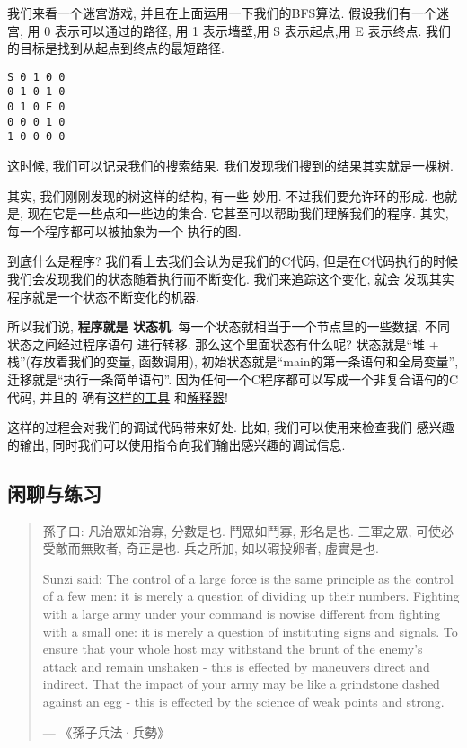 我们来看一个迷宫游戏, 并且在上面运用一下我们的BFS算法. 假设我们有一个迷宫,
用 0 表示可以通过的路径,
用 1 表示墙壁,用 S 表示起点,用 E 表示终点. 我们的目标是找到从起点到终点的最短路径. 

\begin{lstlisting}
S 0 1 0 0
0 1 0 1 0
0 1 0 E 0
0 0 0 1 0
1 0 0 0 0    
\end{lstlisting}



这时候, 我们可以记录我们的搜索结果. 我们发现我们搜到的结果其实就是一棵树. 

 其实, 我们刚刚发现的树这样的结构, 有一些
妙用. 不过我们要允许环的形成. 也就是, 现在它是一些点和一些边的集合.
它甚至可以帮助我们理解我们的程序. 其实, 每一个程序都可以被抽象为一个
执行的图. 

到底什么是程序? 我们看上去我们会认为是我们的C代码, 但是在C代码执行的时候
我们会发现我们的状态随着执行而不断变化. 我们来追踪这个变化, 就会
发现其实程序就是一个状态不断变化的机器. \cite{jyyos-prog}

所以我们说, \textbf{程序就是
状态机}. 每一个状态就相当于一个节点里的一些数据, 不同状态之间经过程序语句
进行转移. 那么这个里面状态有什么呢? 状态就是``堆 + 栈''(存放着我们的变量, 函数调用), 初始状态就是``main的第一条语句和全局变量'', 迁移就是``执行一条简单语句''. 
因为任何一个C程序都可以写成一个非复合语句的C代码, 并且的
确有\href{https://cil-project.github.io/cil/}{这样的工具}
和\href{https://gitlab.com/zsaleeba/picoc}{解释器}! 

这样的过程会对我们的调试代码带来好处. 比如, 我们可以使用来检查我们
感兴趣的输出, 同时我们可以使用指令向我们输出感兴趣的调试信息. 

\subsection*{闲聊与练习} 

\begin{quote}
    孫子曰: 凡治眾如治寡, 分數是也. 鬥眾如鬥寡, 形名是也. 三軍之眾, 可使必受敵而無敗者, 奇正是也. 兵之所加, 如以碬投卵者, 虛實是也. 

    Sunzi said: The control of a large force is the same principle as
    the control of a few men: it is merely a question of dividing up
    their numbers. Fighting with a large army under your command is 
    nowise different from fighting with a small one: it is merely a 
    question of instituting signs and signals. To ensure that your 
    whole host may withstand the brunt of the enemy's attack and 
    remain unshaken - this is effected by maneuvers direct and 
    indirect. That the impact of your army may be like a grindstone 
    dashed against an egg - this is effected by the science of weak 
    points and strong.
    
    \hfill ---  《孫子兵法·兵勢》
\end{quote}

